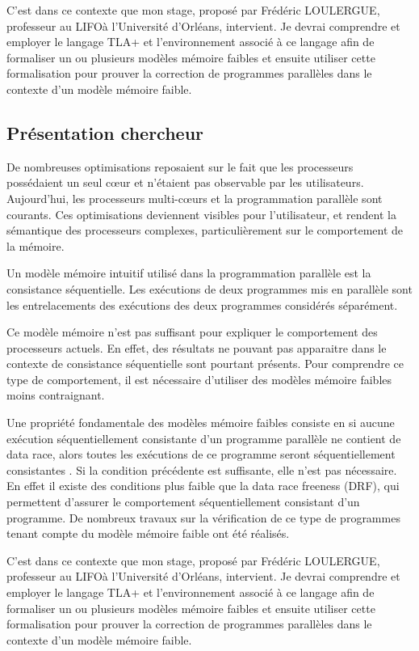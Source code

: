 \documentclass[12pt,a4paper]{article}
\begin{document}
C'est dans ce contexte que mon stage, proposé par Frédéric LOULERGUE, professeur au LIFO\footnotemark[1] à l'Université d'Orléans, intervient. Je devrai comprendre et employer le langage TLA+ \cite{Lamport:2002:SST:579617} et l'environnement associé à ce langage afin de formaliser un ou plusieurs modèles mémoire faibles et ensuite utiliser cette formalisation pour prouver la correction de programmes parallèles dans le contexte d'un modèle mémoire faible. 

\subsection{Présentation chercheur}
De nombreuses optimisations reposaient sur le fait que les processeurs possédaient un seul cœur et n'étaient pas observable par les utilisateurs.
Aujourd'hui, les processeurs multi-cœurs et la programmation parallèle sont courants. Ces optimisations deviennent visibles pour l'utilisateur, et rendent la sémantique des processeurs complexes, particulièrement sur le comportement de la mémoire.

Un modèle mémoire intuitif utilisé dans la programmation parallèle est la consistance séquentielle. Les exécutions de deux programmes mis en parallèle sont les entrelacements des exécutions des deux programmes considérés séparément.
 
Ce modèle mémoire n'est pas suffisant pour expliquer le comportement des processeurs actuels. En effet, des résultats ne pouvant pas apparaitre dans le contexte de consistance séquentielle sont pourtant présents. Pour comprendre ce type de comportement, il est nécessaire d'utiliser des modèles mémoire faibles \cite{Adve:1996:SMC:619013.620590} moins contraignant. 

Une propriété fondamentale des modèles mémoire faibles consiste en si aucune exécution séquentiellement consistante d'un programme parallèle ne contient de data race, alors toutes les exécutions de ce programme seront séquentiellement consistantes \cite{Saraswat:2007:TMM:1229428.1229469}.
Si la condition précédente est suffisante, elle n'est pas nécessaire. En effet il existe des conditions plus faible que la data race freeness (DRF), qui permettent d'assurer le comportement séquentiellement consistant d'un programme\cite{Owens:2010:RIC:1883978.1884011}. De nombreux travaux sur la vérification de ce type de programmes tenant compte du modèle mémoire faible ont été réalisés\cite{Turon:2014:GNW:2714064.2660243}.

C'est dans ce contexte que mon stage, proposé par Frédéric LOULERGUE, professeur au LIFO\footnotemark[1] à l'Université d'Orléans, intervient. Je devrai comprendre et employer le langage TLA+ \cite{Lamport:2002:SST:579617} et l'environnement associé à ce langage afin de formaliser un ou plusieurs modèles mémoire faibles et ensuite utiliser cette formalisation pour prouver la correction de programmes parallèles dans le contexte d'un modèle mémoire faible. 
 
\end{document}
